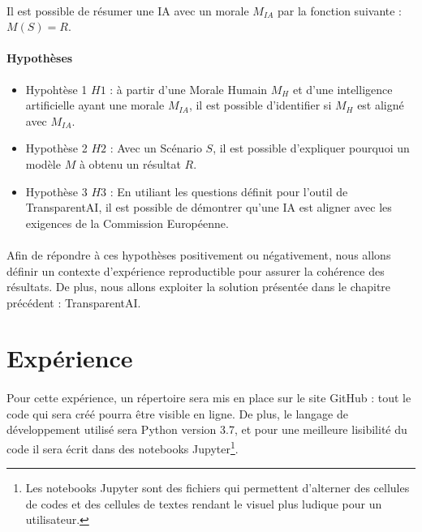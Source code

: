 \documentclass[10pt, french, a4paper]{report}
\begin{document}
\paragraph{}
Il est possible de résumer une IA avec un morale $M_{IA}$ par la fonction suivante : $M(S) = R$.

\paragraph{Hypothèses}

\begin{itemize}
  \item Hypohtèse 1 $H1$ : à partir d'une Morale Humain $M_H$ et d'une intelligence artificielle ayant une morale $M_{IA}$, il est possible d'identifier si $M_H$ est aligné avec $M_{IA}$.
  \item Hypothèse 2 $H2$ : Avec un Scénario $S$, il est possible d'expliquer pourquoi un modèle $M$ à obtenu un résultat $R$.
  \item Hypothèse 3 $H3$ : En utiliant les questions définit pour l'outil de TransparentAI, il est possible de démontrer qu'une IA est aligner avec les exigences de la Commission Européenne.
\end{itemize}

\paragraph{}
Afin de répondre à ces hypothèses positivement ou négativement, nous allons définir un contexte d'expérience reproductible pour assurer la cohérence des résultats. De plus, nous allons exploiter la solution présentée dans le chapitre précédent : TransparentAI.

\section{Expérience}

\paragraph{}
Pour cette expérience, un répertoire sera mis en place sur le site GitHub : tout le code qui sera créé pourra être visible en ligne. De plus, le langage de développement utilisé sera Python version 3.7, et pour une meilleure lisibilité du code il sera écrit dans des notebooks Jupyter\footnote{Les notebooks Jupyter sont des fichiers qui permettent d'alterner des cellules de codes et des cellules de textes rendant le visuel plus ludique pour un utilisateur.}.
\end{document}
